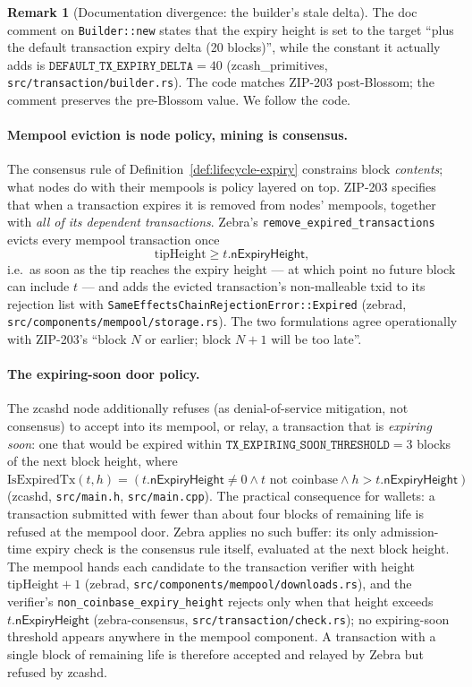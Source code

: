 \documentclass[11pt,a4paper]{article}
\theoremstyle{definition}
\newtheorem{remark}[theorem]{Remark}
\begin{document}
\begin{remark}[Documentation divergence: the builder's stale delta]
\label{rem:lifecycle-builder-doc}
The doc comment on \texttt{Builder::new} states that the expiry height is
set to the target ``plus the default transaction expiry delta (20
blocks)'', while the constant it actually adds is
$\mathtt{DEFAULT\_TX\_EXPIRY\_DELTA} = 40$
(\textsf{zcash\_primitives}, \texttt{src/transaction/builder.rs}). The
code matches ZIP-203 post-Blossom; the comment preserves the pre-Blossom
value. We follow the code.
\end{remark}

\paragraph{Mempool eviction is node policy, mining is consensus.} The
consensus rule of Definition~\ref{def:lifecycle-expiry} constrains block
\emph{contents}; what nodes do with their mempools is policy layered on
top. ZIP-203 specifies that when a transaction expires it is removed from
nodes' mempools, together with \emph{all of its dependent transactions}.
Zebra's \texttt{remove\_expired\_transactions} evicts every mempool
transaction once
\[
\mathrm{tipHeight} \ge t.\mathsf{nExpiryHeight},
\]
i.e.\ as soon as the tip reaches the expiry height --- at which point no
future block can include $t$ --- and adds the evicted transaction's
non-malleable txid to its rejection list with
\texttt{SameEffectsChainRejectionError::Expired} (\textsf{zebrad},
\texttt{src/components/mempool/storage.rs}). The two formulations agree
operationally with ZIP-203's ``block $N$ or earlier; block $N+1$ will be
too late''.

\paragraph{The expiring-soon door policy.} The \textsf{zcashd} node
additionally
refuses (as denial-of-service mitigation, not consensus) to accept into its
mempool, or relay, a transaction that is \emph{expiring soon}: one that
would be expired within $\mathtt{TX\_EXPIRING\_SOON\_THRESHOLD} = 3$ blocks
of the next block height, where
$\mathrm{IsExpiredTx}(t, h) = (t.\mathsf{nExpiryHeight} \neq 0 \wedge
t \text{ not coinbase} \wedge h > t.\mathsf{nExpiryHeight})$
(\textsf{zcashd}, \texttt{src/main.h}, \texttt{src/main.cpp}). The
practical consequence for wallets: a transaction submitted with fewer than
about four blocks of remaining life is refused at the mempool door.
Zebra applies no such buffer: its only admission-time expiry check is the
consensus rule itself, evaluated at the next block height. The mempool
hands each candidate to the transaction verifier with height
$\mathrm{tipHeight} + 1$ (\textsf{zebrad},
\texttt{src/components/mempool/downloads.rs}), and the verifier's
\texttt{non\_coinbase\_expiry\_height} rejects only when that height
exceeds $t.\mathsf{nExpiryHeight}$ (\textsf{zebra-consensus},
\texttt{src/transaction/check.rs}); no expiring-soon threshold appears
anywhere in the mempool component. A transaction with a single block of
remaining life is therefore accepted and relayed by Zebra but refused by
\textsf{zcashd}.
\end{document}
